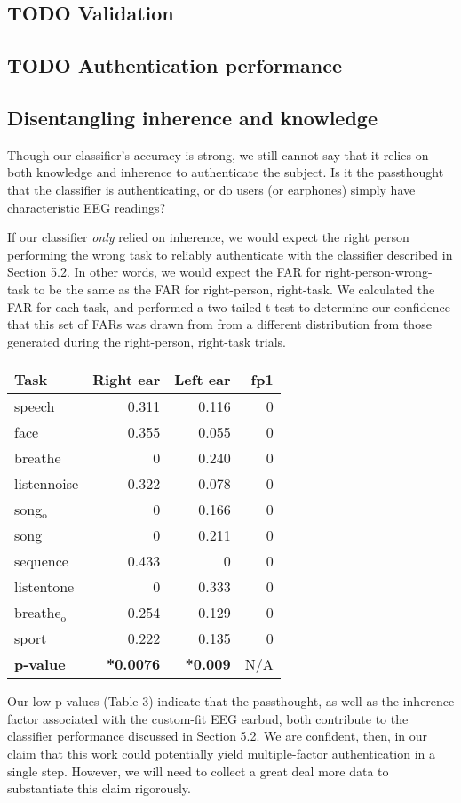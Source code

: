 \documentclass[11pt]{article}
\begin{document}
\subsection{{\bfseries\sffamily TODO} Validation}
\label{sec:orgdae54ad}
\subsection{{\bfseries\sffamily TODO} Authentication performance}
\label{sec:org14de4b9}
\subsection{Disentangling inherence and knowledge}
\label{sec:org91c37b4}

Though our classifier's accuracy is strong, we still cannot say that it relies 
on both knowledge and inherence to authenticate the subject. Is it the passthought
that the classifier is authenticating, or do users (or earphones) simply have characteristic
EEG readings? 

If our classifier \emph{only} relied on inherence, we would expect the right person performing
the wrong task to reliably authenticate with the classifier described in Section 5.2.
In other words, we would expect the FAR for right-person-wrong-task to be the same 
as the FAR for right-person, right-task. We calculated the FAR for each task, and performed
a two-tailed t-test to determine our confidence that this set of FARs was drawn from
from a different distribution from those generated during the right-person, right-task trials.

\begin{center}
\begin{tabular}{lrrr}
Task & Right ear & Left ear & fp1\\
\hline
speech & 0.311 & 0.116 & 0\\
face & 0.355 & 0.055 & 0\\
breathe & 0 & 0.240 & 0\\
listennoise & 0.322 & 0.078 & 0\\
song\(_{\text{o}}\) & 0 & 0.166 & 0\\
song & 0 & 0.211 & 0\\
sequence & 0.433 & 0 & 0\\
listentone & 0 & 0.333 & 0\\
breathe\(_{\text{o}}\) & 0.254 & 0.129 & 0\\
sport & 0.222 & 0.135 & 0\\
\hline
\textbf{p-value} & \textbf{*0.0076} & \textbf{*0.009} & N/A\\
\end{tabular}
\end{center}
Our low p-values (Table 3) indicate that the passthought, as well as the inherence
factor associated with the custom-fit EEG earbud, both contribute to the classifier
performance discussed in Section 5.2. We are confident, then, in our claim that this work
could potentially yield multiple-factor authentication in a single step. However, we
will need to collect a great deal more data to substantiate this claim rigorously.
\end{document}
